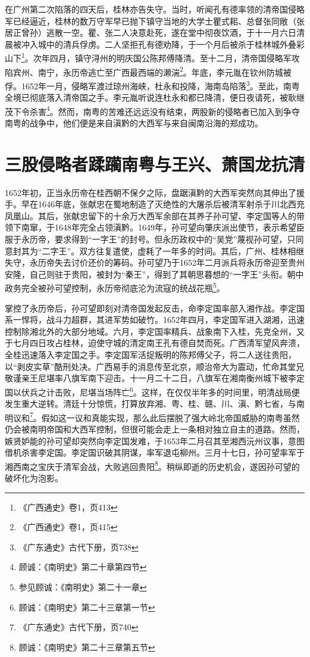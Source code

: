 在广州第二次陷落的四天后，桂林亦告失守。当时，听闻孔有德率领的清帝国侵略军已经逼近，桂林的数万守军早已抛下镇守当地的大学士瞿式耜、总督张同敞（张居正曾孙）逃散一空。瞿、张二人决意赴死，遂在堂中彻夜饮酒，于十一月六日清晨被冲入城中的清兵俘虏。二人坚拒孔有德劝降，于一个月后被杀于桂林城外叠彩山下\footnote{《广西通史》卷1，页413}。次年四月，镇守浔州的明庆国公陈邦傅降清。至十二月，清帝国侵略军攻陷宾州、南宁，永历帝逃亡至广西最西端的濑湍\footnote{《广西通史》卷1，页415}。年底，李元胤在钦州防城被俘。1652年一月，侵略军渡过琼州海峡，杜永和投降，海南岛陷落\footnote{《广东通史》古代下册，页738}。至此，南粤全境已彻底落入清帝国之手。李元胤听说连杜永和都已降清，便日夜请死，被耿继茂下令杀害\footnote{顾诚：《南明史》第二十章第四节}。然而，南粤的苦难还远远没有结束，两股新的侵略者已加入到争夺南粤的战争中，他们便是来自滇黔的大西军与来自闽南沿海的郑成功。


\section{三股侵略者蹂躏南粤与王兴、萧国龙抗清}

\indent 1652年初，正当永历帝在桂西朝不保夕之际，盘踞滇黔的大西军突然向其伸出了援手。早在1646年底，张献忠在蜀地制造了灭绝性的大屠杀后被清军射杀于川北西充凤凰山。其后，张献忠留下的十余万大西军余部在其养子孙可望、李定国等人的带领下南窜，于1648年完全占领滇黔。1649年，孙可望向肇庆派出使节，表示希望臣服于永历帝，要求得到“一字王”的封号。但永历政权中的“吴党”蔑视孙可望，只同意封其为“二字王”。双方往复遣使，虚耗了一年多的时间。其后，广州、桂林相继失守，永历帝失去讨价还价的筹码。孙可望乃于1652年二月派兵将永历帝迎至贵州安隆，自己则驻于贵阳，被封为“秦王”，得到了其朝思暮想的“一字王”头衔。朝中政务完全被孙可望控制，永历帝彻底沦为流寇的统战花瓶\footnote{参见顾诚：《南明史》第二十一章}。

掌控了永历帝后，孙可望即刻对清帝国发起反击，命李定国率部入湘作战。李定国系一悍将，战斗力超群，其进军势如破竹。1652年四月，李定国军进入湖湘，迅速控制除湘北外的大部分地域。六月，李定国率精兵、战象南下入桂，先克全州，又于七月四日攻占桂林，迫使守城的清定南王孔有德自焚而死。广西清军望风奔溃，全桂迅速落入李定国之手。李定国军活捉叛明的陈邦傅父子，将二人送往贵阳，以“剥皮实草”酷刑处决。广西易手的消息传至北京，顺治帝大为震动，忙命其堂兄敬谨亲王尼堪率八旗军南下迎击。十一月二十二日，八旗军在湘南衡州城下被李定国以伏兵之计击败，尼堪当场阵亡\footnote{顾诚：《南明史》第二十三章第一节}。这样，在仅仅半年多的时间里，明清战局便发生重大逆转。清廷十分惊慌，打算放弃湘、粤、桂、赣、川、滇、黔七省，与南明议和\footnote{《广东通史》古代下册，页740}。假如这一议和真能实现，那么此后摆脱了强大岭北帝国威胁的南粤虽然仍会被南明帝国和大西军控制，但很可能会走上一条相对独立自主的道路。然而，嫉贤妒能的孙可望却突然向李定国发难，于1653年二月召其至湘西沅州议事，意图借机杀害李定国。李定国识破其阴谋，率军退屯柳州。三月十七日，孙可望率军于湘西南之宝庆于清军会战，大败逃回贵阳\footnote{顾诚：《南明史》第二十三章第五节}。稍纵即逝的历史机会，遂因孙可望的破坏化为泡影。

